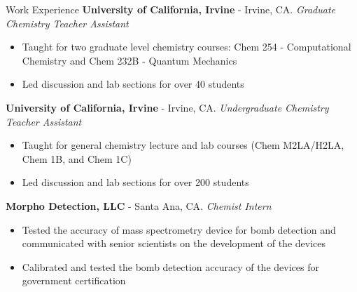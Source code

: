 \begin{rubric}{Work Experience}
  \textbf{University of California, Irvine} - Irvine, CA.
  \textit{Graduate Chemistry Teacher Assistant}
  \vspace{-0.5em}
  \begin{itemize}
    \itemsep-0.5em
  \item Taught for two graduate level chemistry courses:
    Chem 254 - Computational Chemistry and Chem 232B - Quantum Mechanics
  \item Led discussion and lab sections for over 40 students
  \vspace{-1em}
  \end{itemize}
%
  \textbf{University of California, Irvine} - Irvine, CA.
  \textit{Undergraduate Chemistry Teacher Assistant}
  \vspace{-0.5em}
  \begin{itemize}
    \itemsep-0.5em
  \item Taught for general chemistry lecture and lab courses (Chem M2LA/H2LA,
    Chem 1B, and Chem 1C)
  \item Led discussion and lab sections for over 200 students
  \vspace{-1em}
  \end{itemize}
%
  \textbf{Morpho Detection, LLC} - Santa Ana, CA.
  \textit{Chemist Intern}
  \vspace{-0.5em}
  \begin{itemize}
    \itemsep-0.5em
  \item Tested the accuracy of mass spectrometry device for bomb detection and communicated
    with senior scientists on the development of the devices
  \item Calibrated and tested the bomb detection accuracy of the devices for
    government certification
  \vspace{-2em}
  \end{itemize}
%
%
%
\end{rubric}
